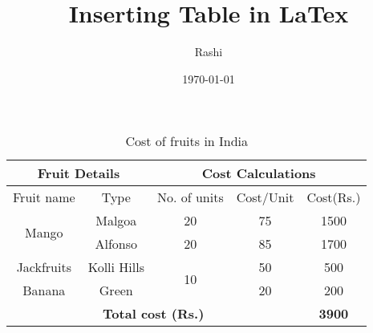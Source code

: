 \documentclass{article}
\begin{document}
	\title{Inserting Table in LaTex}
	\author{Rashi}
	\date{\today}
	\maketitle
	\blindtext[2]
	\begin{table*}[h]
		\centering
		\caption{Cost of fruits in India}
		\vspace{0.5cm}
		\begin{tabular}{||c|c|c|c|c||}
			\hline
			\multicolumn{2}{||c|}{Fruit Details} & \multicolumn{3}{c||}{Cost Calculations} \\ \hline
			Fruit name & Type & No. of units & Cost/Unit & Cost(Rs.) \\ \hline
			\multirow[t]{2}{*}{Mango} & Malgoa & 20 & 75 & 1500 \\ \cline{2-5}
			& Alfonso & 20 & 85 & 1700 \\ \hline
			Jackfruits & Kolli Hills & \multirow[t]{2}{*}{10} & 50 & 500 \\ \cline{1-2} \cline{4-5} 
			Banana & Green & & 20 & 200 \\ \hline
			\multicolumn{4}{||c|}{\textbf{Total cost (Rs.)}} & \textbf{3900} \\ \hline
		\end{tabular}
	\end{table*}
\end{document}
